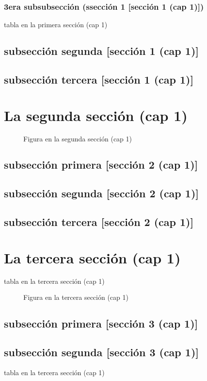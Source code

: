\documentclass[12pt,a4paper]{report}
\begin{document}
\subsubsection{3era subsubsección (ssección 1 [sección 1 (cap 1)])}
\begin{table}[H]
\caption{tabla en la primera sección (cap 1)}
\end{table}
\subsection{subsección segunda [sección 1 (cap 1)]}
\subsection{subsección tercera [sección 1 (cap 1)]}
\section{La segunda sección (cap 1)}
\begin{figure}[H]
\caption{Figura en la segunda sección (cap 1)}
\end{figure}
\subsection{subsección primera [sección 2 (cap 1)]}
\subsection{subsección segunda [sección 2 (cap 1)]}
\subsection{subsección tercera [sección 2 (cap 1)]}
\section{La tercera sección (cap 1)}
\begin{table}[H]
\caption{tabla en la tercera sección (cap 1)}
\end{table}
\begin{figure}[H]
\caption{Figura en la tercera sección (cap 1)}
\end{figure}
\subsection{subsección primera [sección 3 (cap 1)]}
\subsection{subsección segunda [sección 3 (cap 1)]}
\begin{table}[H]
\caption{tabla en la tercera sección (cap 1)}
\end{table}
\end{document}
